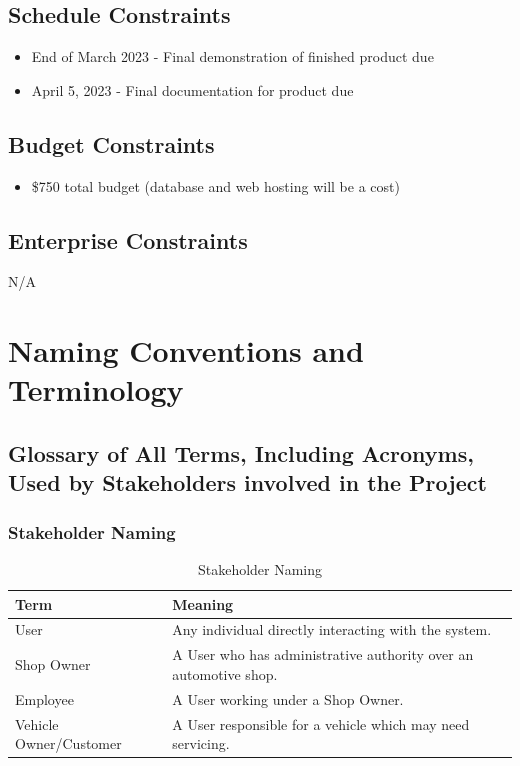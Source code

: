 \documentclass[12pt]{article}
\begin{document}
\subsection{Schedule Constraints}
\begin{itemize}
    \item End of March 2023 - Final demonstration of finished product due
    \item April 5, 2023 - Final documentation for product due
\end{itemize}
\subsection{Budget Constraints}
\begin{itemize}
    \item \$750 total budget (database and web hosting will be a cost)
\end{itemize}
\subsection{Enterprise Constraints}
N/A

\section{Naming Conventions and Terminology}
\subsection{Glossary of All Terms, Including Acronyms, Used by Stakeholders involved in the Project}
\subsubsection{Stakeholder Naming}
\renewcommand{\arraystretch}{1.2}
\begin{table}[H]
    \begin{tabularx}{\textwidth}{l X}
        \toprule
        \textbf{Term} & \textbf{Meaning} \\
        \midrule
        User & Any individual directly interacting with the system.\\
        Shop Owner & A User who has administrative authority over an automotive shop.\\
        Employee & A User working under a Shop Owner.\\
        Vehicle Owner/Customer & A User responsible for a vehicle which may need servicing.\\ %
        \bottomrule
    \end{tabularx} \\ \\
    \caption{Stakeholder Naming}
\end{table}
\end{document}
